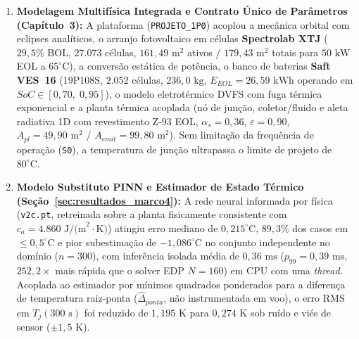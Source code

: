 \begin{enumerate}[label=\textbf{\arabic*.},leftmargin=*]
    \item \textbf{Modelagem Multifísica Integrada e Contrato Único de Parâmetros (Capítulo~3):} A plataforma (\texttt{PROJETO\_1P0}) acoplou a mecânica orbital com eclipses analíticos, o arranjo fotovoltaico em células \textbf{Spectrolab XTJ} ($29{,}5\%$ BOL, $27.073$ células, $161{,}49\text{ m}^2$ ativos / $179{,}43\text{ m}^2$ totais para $50\text{ kW}$ EOL a $65^\circ\text{C}$), a conversão estática de potência, o banco de baterias \textbf{Saft VES~16} ($19\text{P}108\text{S}$, $2.052$ células, $236{,}0\text{ kg}$, $E_{EOL} = 26{,}59\text{ kWh}$ operando em $SoC \in [0{,}70,\; 0{,}95]$), o modelo eletrotérmico DVFS com fuga térmica exponencial e a planta térmica acoplada (nó de junção, coletor/fluido e aleta radiativa 1D com revestimento Z-93 EOL, $\alpha_s = 0{,}36$, $\varepsilon = 0{,}90$, $A_{pl} = 49{,}90\text{ m}^2$ / $A_{emit} = 99{,}80\text{ m}^2$). Sem limitação da frequência de operação (\texttt{S0}), a temperatura de junção ultrapassa o limite de projeto de $80^\circ\text{C}$.

    \item \textbf{Modelo Substituto PINN e Estimador de Estado Térmico (Seção~\ref{sec:resultados_marco4}):} A rede neural informada por física (\texttt{v2c.pt}, retreinada sobre a planta fisicamente consistente com $c_a = 4.860\text{ J/(m}^2\cdot\text{K)}$) atingiu erro mediano de $0{,}215^\circ\text{C}$, $89{,}3\%$ dos casos em $\le 0{,}5^\circ\text{C}$ e pior subestimação de $-1{,}086^\circ\text{C}$ no conjunto independente no domínio ($n = 300$), com inferência isolada média de $0{,}36\text{ ms}$ ($p_{99} = 0{,}39\text{ ms}$, $252{,}2\times$ mais rápida que o solver EDP $N=160$) em CPU com uma \textit{thread}. Acoplada ao estimador por mínimos quadrados ponderados para a diferença de temperatura raiz-ponta ($\hat{\Delta}_{ponta}$, não instrumentada em voo), o erro RMS em $T_j(300\text{ s})$ foi reduzido de $1{,}195\text{ K}$ para $0{,}274\text{ K}$ sob ruído e viés de sensor ($\pm 1{,}5\text{ K}$).


\end{enumerate}

